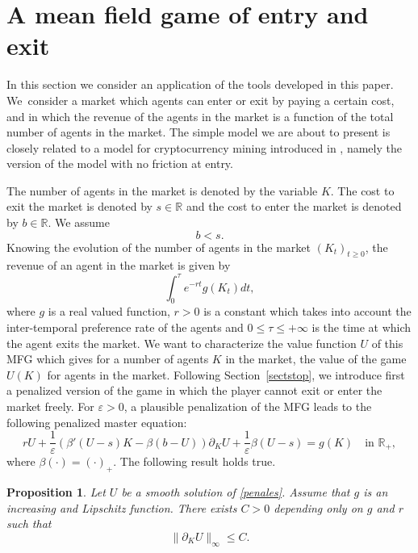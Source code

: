 \documentclass[10pt]{amsart}
\let\epsilon\varepsilon
\newtheorem{Prop}{Proposition}[section]
\theoremstyle{definition}
\begin{document}
\section{A mean field game of entry and exit}\label{sec:5}
In this section we consider an application of the tools developed in this paper. We~consider a market which agents can enter or exit by paying a certain cost, and in which the revenue of the agents in the market is a function of the total number of agents in the market. The simple model we are about to present is closely related to a model for cryptocurrency mining introduced in \cite{bertucci2020mean}, namely the version of the model with no friction at entry.

The number of agents in the market is denoted by the variable $K$. The cost to exit the market is denoted by $s \in \mathbb{R}$ and the cost to enter the market is denoted by $b \in \mathbb{R}$. We assume\vspace*{-5pt}
\begin{equation*}
b < s.
\end{equation*}
Knowing the evolution of the number of agents in the market $(K_t)_{t \geq 0}$, the revenue of an agent in the market is given by\vspace*{-5pt}
\begin{equation*}
\int_0^{\tau} e^{-rt}g(K_t)dt,
\end{equation*}
where $g$ is a real valued function, $r> 0$ is a constant which takes into account the inter-temporal preference rate of the agents and $0\leq \tau \leq+\infty$ is the time at which the agent exits the market. We want to characterize the value function $U$ of this MFG which gives for a number of agents $K$ in the market, the value of the game $U(K)$ for agents in the market. Following Section~\ref{sectstop}, we introduce first a penalized version of the game in which the player cannot exit or enter the market freely. For $\epsilon > 0$, a plausible penalization of the MFG leads to the following penalized master equation:\vspace*{-3pt}
\begin{equation}\label{penales}
rU+\frac{1}{\epsilon} \left(\beta'(U-s)K-\beta(b-U)\right)\partial_K U+\frac{1}{\epsilon} \beta(U -s) = g(K) \quad\text{in } \mathbb{R}_+,
\end{equation}
where $\beta(\cdot) = (\cdot)_+$. The following result holds true.
\begin{Prop}
Let $U$ be a smooth solution of \eqref{penales}. Assume that $g$ is an increasing and Lipschitz function. There exists $C > 0$ depending only on $g$ and $r$ such that
\begin{equation*}
\|\partial_K U\|_{\infty} \leq C.
\end{equation*}
\end{Prop}
\end{document}
